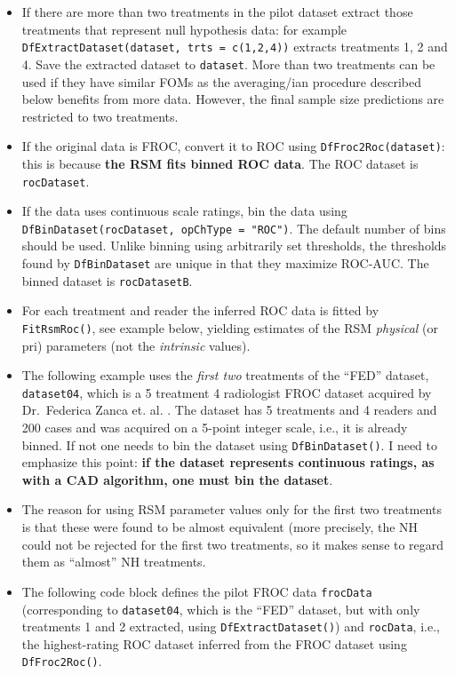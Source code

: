 \documentclass[
]{book}
\begin{document}
\begin{itemize}
\item
  If there are more than two treatments in the pilot dataset extract those treatments that represent null hypothesis data: for example \texttt{DfExtractDataset(dataset,\ trts\ =\ c(1,2,4))} extracts treatments 1, 2 and 4. Save the extracted dataset to \texttt{dataset}. More than two treatments can be used if they have similar FOMs as the averaging/ian procedure described below benefits from more data. However, the final sample size predictions are restricted to two treatments.
\item
  If the original data is FROC, convert it to ROC using \texttt{DfFroc2Roc(dataset)}: this is because \textbf{the RSM fits binned ROC data}. The ROC dataset is \texttt{rocDataset}.
\item
  If the data uses continuous scale ratings, bin the data using \texttt{DfBinDataset(rocDataset,\ opChType\ =\ "ROC")}. The default number of bins should be used. Unlike binning using arbitrarily set thresholds, the thresholds found by \texttt{DfBinDataset} are unique in that they maximize ROC-AUC. The binned dataset is \texttt{rocDatasetB}.
\item
  For each treatment and reader the inferred ROC data is fitted by \texttt{FitRsmRoc()}, see example below, yielding estimates of the RSM \emph{physical} (or pri) parameters (not the \emph{intrinsic} values).
\item
  The following example uses the \emph{first two} treatments of the ``FED'' dataset, \texttt{dataset04}, which is a 5 treatment 4 radiologist FROC dataset acquired by Dr.~Federica Zanca et. al. \citep{RN1882}. The dataset has 5 treatments and 4 readers and 200 cases and was acquired on a 5-point integer scale, i.e., it is already binned. If not one needs to bin the dataset using \texttt{DfBinDataset()}. I need to emphasize this point: \textbf{if the dataset represents continuous ratings, as with a CAD algorithm, one must bin the dataset}.
\item
  The reason for using RSM parameter values only for the first two treatments is that these were found \citep{RN1882} to be almost equivalent (more precisely, the NH could not be rejected for the first two treatments, so it makes sense to regard them as ``almost'' NH treatments.
\item
  The following code block defines the pilot FROC data \texttt{frocData} (corresponding to \texttt{dataset04}, which is the ``FED'' dataset, but with only treatments 1 and 2 extracted, using \texttt{DfExtractDataset()}) and \texttt{rocData}, i.e., the highest-rating ROC dataset inferred from the FROC dataset using \texttt{DfFroc2Roc()}.
\end{itemize}
\end{document}
